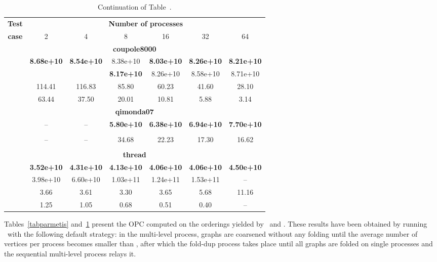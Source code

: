 \documentclass[fleqn,12pt,twoside]{article}
\begin{document}
\begin{table}[hbt]
\begin{center}
  \begin{tabular}{|l||c|c|c|c|c|c|}
    \hline
    \multicolumn{1}{|c||}{{\bf Test}} &
    \multicolumn{6}{c|}{{\bf Number of processes}}\\
    \cline{2-7}
     \multicolumn{1}{|c||}{{\bf case}} & 2 & 4 & 8 & 16 & 32 & 64 \\
    \hline
    \hline
    \multicolumn{7}{|c|}{{\bf coupole8000}} \\
    \hline
     & \textbf{8.68e+10} & \textbf{8.54e+10} & 8.38e+10 & \textbf{8.03e+10} & \textbf{8.26e+10} & \textbf{8.21e+10} \\
      &    &    & \textbf{8.17e+10} & 8.26e+10 & 8.58e+10 & 8.71e+10 \\
     & 114.41   & 116.83   & 85.80    & 60.23    & 41.60    & 28.10    \\
      & 63.44    & 37.50    & 20.01    & 10.81    & 5.88     & 3.14     \\
    \hline
    \multicolumn{7}{|c|}{{\bf qimonda07}} \\
    \hline
     & -- & -- & \textbf{5.80e+10} & \textbf{6.38e+10} & \textbf{6.94e+10} & \textbf{7.70e+10} \\
      &  &  &  &  &    &   \\
     & --  & -- & 34.68 & 22.23 & 17.30 & 16.62 \\
      &   & &  &  &   &   \\
    \hline
\multicolumn{7}{|c|}{{\bf thread}} \\
    \hline
     & \textbf{3.52e+10} & \textbf{4.31e+10} & \textbf{4.13e+10} & \textbf{4.06e+10} & \textbf{4.06e+10} & \textbf{4.50e+10} \\
      & 3.98e+10 & 6.60e+10 & 1.03e+11 & 1.24e+11 & 1.53e+11 & --       \\
     & 3.66     & 3.61     & 3.30     & 3.65     & 5.68     & 11.16    \\
      & 1.25     & 1.05     & 0.68     &  0.51    & 0.40     & --       \\
    \hline
  \end{tabular}
\end{center}
\caption{Continuation of Table~\protect{\ref{tabparmetis}}.}
\label{tabparmetisparttwo}
\end{table}
 
Tables~\ref{tabparmetis} and~\ref{tabparmetisparttwo} present the OPC
computed on the orderings yielded by \ptscotch\ and \parmetis. These
results have been obtained by running \ptscotch\ with the following
default strategy: in the multi-level process, graphs are coarsened
without any folding until the average number of vertices per process
becomes smaller than , after which the fold-dup process takes
place until all graphs are folded on single processes and the
sequential multi-level process relays it.
\end{document}
